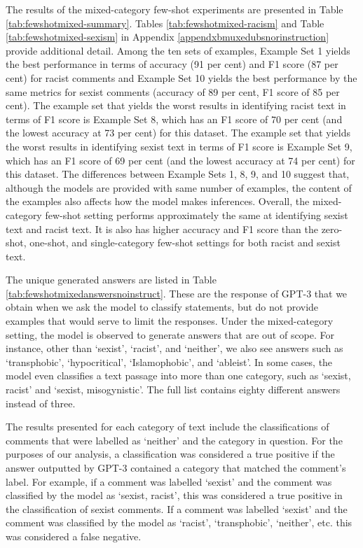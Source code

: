 \documentclass{bmcart}
\begin{document}
The results of the mixed-category few-shot experiments are presented in Table \ref{tab:fewshotmixed-summary}. Tables \ref{tab:fewshotmixed-racism} and Table \ref{tab:fewshotmixed-sexism} in Appendix \ref{appendxbmuxedubsnorinstruction} provide additional detail. Among the ten sets of examples, Example Set 1 yields the best performance in terms of accuracy (91 per cent) and F1 score (87 per cent) for racist comments and Example Set 10 yields the best performance by the same metrics for sexist comments (accuracy of 89 per cent, F1 score of 85 per cent). The example set that yields the worst results in identifying racist text in terms of F1 score is Example Set 8, which has an F1 score of 70 per cent (and the lowest accuracy at 73 per cent) for this dataset. The example set that yields the worst results in identifying sexist text in terms of F1 score is Example Set 9, which has an F1 score of 69 per cent (and the lowest accuracy at 74 per cent) for this dataset. The differences between Example Sets 1, 8, 9, and 10 suggest that, although the models are provided with same number of examples, the content of the examples also affects how the model makes inferences. Overall, the mixed-category few-shot setting performs approximately the same at identifying sexist text and racist text. It is also has higher accuracy and F1 score than the zero-shot, one-shot, and single-category few-shot settings for both racist and sexist text.

The unique generated answers are listed in Table \ref{tab:fewshotmixedanswersnoinstruct}. These are the response of GPT-3 that we obtain when we ask the model to classify statements, but do not provide examples that would serve to limit the responses. Under the mixed-category setting, the model is observed to generate answers that are out of scope. For instance, other than `sexist', `racist', and `neither', we also see answers such as `transphobic', `hypocritical', `Islamophobic', and `ableist'. In some cases, the model even classifies a text passage into more than one category, such as `sexist, racist' and `sexist, misogynistic'. The full list contains eighty different answers instead of three.

The results presented for each category of text include the classifications of comments that were labelled as `neither' and the category in question. For the purposes of our analysis, a classification was considered a true positive if the answer outputted by GPT-3 contained a category that matched the comment's label. For example, if a comment was labelled `sexist' and the comment was classified by the model as `sexist, racist', this was considered a true positive in the classification of sexist comments. If a comment was labelled `sexist' and the comment was classified by the model as `racist', `transphobic', `neither', etc. this was considered a false negative.
\end{document}
